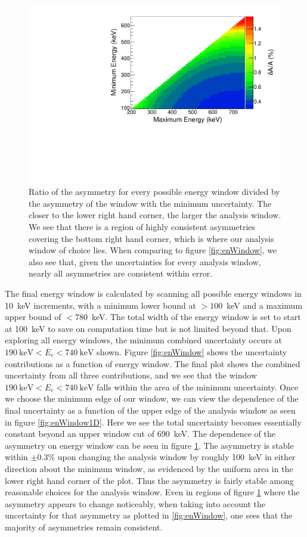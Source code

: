 \begin{figure}[H]
\centering
\includegraphics[page=4,scale=.5]{5-UCNAResults/TwoDimUncert.pdf}
\caption{Ratio of the asymmetry for every possible energy window divided by the
  asymmetry of the window with the minimum uncertainty. The closer to the lower right
  hand corner, the larger the analysis window. We see that there is a region of highly
  consistent asymmetries covering the bottom right hand corner, which is where our analysis
  window of choice lies. When comparing
  to figure \ref{fig:enWindow}, we also see that, given the uncertainties for every
  analysis window, nearly all asymmetries are consistent within error.}
\label{fig:enWindowAsymm}
\end{figure}

The final energy window is calculated by scanning all possible energy windows in
10~keV increments, with a minimum lower bound at
$>100$~keV and a maximum upper bound of $<780$~keV. The total width of the energy window
is set to start at 100~keV to save on computation
time but is not limited beyond that. Upon exploring all energy windows, the minimum combined uncertainty
occurs at $190\mathrm{~keV} < E_e < 740\mathrm{~keV}$ shown.
Figure \ref{fig:enWindow} shows the uncertainty contributions as a function of energy window. The
final plot shows the combined uncertainty from all three contributions, and we
see that the window $190\mathrm{~keV} < E_e < 740\mathrm{~keV}$ falls within the area
of the minimum uncertainty. Once we choose the minimum edge of our window, we can view the
dependence of the final uncertainty as a function of the upper edge of the analysis window
as seen in figure \ref{fig:enWindow1D}. Here we see the total uncertainty becomes essentially
constant beyond an upper window cut of 690~keV.
The dependence of the asymmetry on energy window can be seen in figure \ref{fig:enWindowAsymm}.
The asymmetry is stable within $\pm0.3\%$ upon changing the analysis window
by roughly 100~keV in either direction about the minimum window, as evidenced by the uniform
area in the lower right hand corner of the plot. Thus the asymmetry is fairly stable among
reasonable choices for the analysis window. Even in regions of figure \ref{fig:enWindowAsymm}
where the asymmetry appears to change noticeably, when taking into account the uncertainty
for that asymmetry as plotted in \ref{fig:enWindow}, one sees that the majority of
asymmetries remain consistent.


